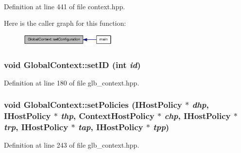 Definition at line 441 of file context.hpp.

Here is the caller graph for this function:\nopagebreak
\begin{figure}[H]
\begin{center}
\leavevmode
\includegraphics[width=137pt]{class_global_context_a7bf92109c22a9c883b6ca92143098019_icgraph}
\end{center}
\end{figure}
\hypertarget{class_global_context_a4e609aa8aeab13c2529b7a3f3d204ec5}{
\subsubsection[{setID}]{\setlength{\rightskip}{0pt plus 5cm}void GlobalContext::setID (int {\em id})}}
\label{class_global_context_a4e609aa8aeab13c2529b7a3f3d204ec5}


Definition at line 180 of file glb\_\-context.hpp.\hypertarget{class_global_context_a764ed43467db5334719f4bfdddc4dc6b}{
\subsubsection[{setPolicies}]{\setlength{\rightskip}{0pt plus 5cm}void GlobalContext::setPolicies ({\bf IHostPolicy} $\ast$ {\em dhp}, \/  {\bf IHostPolicy} $\ast$ {\em thp}, \/  {\bf ContextHostPolicy} $\ast$ {\em chp}, \/  {\bf IHostPolicy} $\ast$ {\em trp}, \/  {\bf IHostPolicy} $\ast$ {\em tap}, \/  {\bf IHostPolicy} $\ast$ {\em tpp})}}
\label{class_global_context_a764ed43467db5334719f4bfdddc4dc6b}


Definition at line 243 of file glb\_\-context.hpp.

